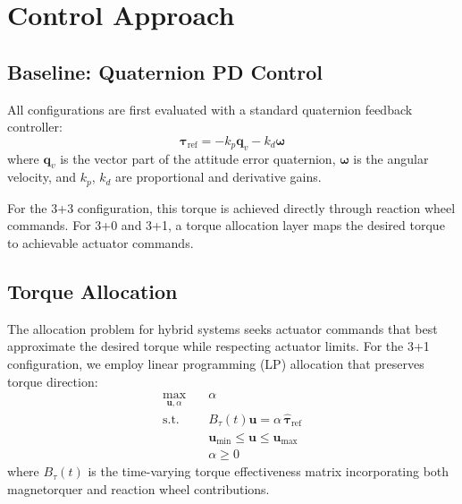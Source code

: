 \documentclass[9pt]{extarticle}
\begin{document}
\section{Control Approach}\label{sec:control}

\subsection{Baseline: Quaternion PD Control}

All configurations are first evaluated with a standard quaternion feedback controller:
\begin{equation}
    \boldsymbol{\tau}_{\text{ref}} = -k_p \mathbf{q}_v - k_d \boldsymbol{\omega}
    \label{eq:pd_control}
\end{equation}
where $\mathbf{q}_v$ is the vector part of the attitude error quaternion, $\boldsymbol{\omega}$ is the angular velocity, and $k_p$, $k_d$ are proportional and derivative gains.

For the 3+3 configuration, this torque is achieved directly through reaction wheel commands. For 3+0 and 3+1, a torque allocation layer maps the desired torque to achievable actuator commands.

\subsection{Torque Allocation}

The allocation problem for hybrid systems seeks actuator commands that best approximate the desired torque while respecting actuator limits. For the 3+1 configuration, we employ linear programming (LP) allocation that preserves torque direction:
\begin{equation}
\begin{aligned}
\max_{\mathbf{u}, \alpha} \quad & \alpha \\
\text{s.t.} \quad & B_\tau(t) \mathbf{u} = \alpha \, \hat{\boldsymbol{\tau}}_{\text{ref}} \\
& \mathbf{u}_{\min} \leq \mathbf{u} \leq \mathbf{u}_{\max} \\
& \alpha \geq 0
\end{aligned}
\end{equation}
where $B_\tau(t)$ is the time-varying torque effectiveness matrix incorporating both magnetorquer and reaction wheel contributions.
\end{document}
